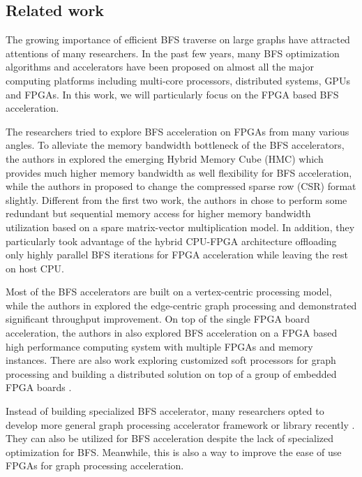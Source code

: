 \subsection{Related work}
The growing importance of efficient BFS traverse on large graphs 
have attracted attentions of many researchers. In the past few years, 
many BFS optimization algorithms and accelerators have been proposed 
on almost all the major computing platforms including multi-core processors, 
distributed systems, GPUs and FPGAs. In this work, we will 
particularly focus on the FPGA based BFS acceleration. 

The researchers tried to explore BFS acceleration 
on FPGAs from many various angles.
To alleviate the memory bandwidth bottleneck of the 
BFS accelerators, the authors in \cite{zhang2017boosting} 
explored the emerging Hybrid Memory Cube (HMC) which provides 
much higher memory bandwidth as well flexibility for BFS 
acceleration, while the authors in \cite{attia2014cygraph} 
proposed to change the compressed sparse row (CSR) format slightly. 
Different from the first two work, the authors in \cite{umuroglu2015hybrid} 
chose to perform some redundant but sequential memory access for higher memory bandwidth 
utilization based on a spare matrix-vector multiplication model.
In addition, they particularly took advantage of the 
hybrid CPU-FPGA architecture offloading only highly parallel 
BFS iterations for FPGA acceleration while leaving the rest 
on host CPU.  

Most of the BFS accelerators are built on a vertex-centric 
processing model, while the authors 
in \cite{zhou2016high} explored the edge-centric graph processing and demonstrated 
significant throughput improvement. On top of the single FPGA board acceleration, 
the authors in \cite{attia2014cygraph, betkaoui2012reconfigurable} also explored 
BFS acceleration on a FPGA based high performance computing system with multiple 
FPGAs and memory instances. There are also work exploring customized soft processors 
for graph processing and building a distributed solution on 
top of a group of embedded FPGA boards \cite{kapre2015custom, wang2010message}.

Instead of building specialized BFS accelerator, many researchers opted to develop 
more general graph processing accelerator framework or library 
recently \cite{engelhardt2016gravf, oguntebi2016graphops, Dai2017foregraph, dai2016fpgp}. 
They can also be utilized for BFS acceleration despite the lack of 
specialized optimization for BFS. Meanwhile, this is also a way to improve 
the ease of use FPGAs for graph processing acceleration.


